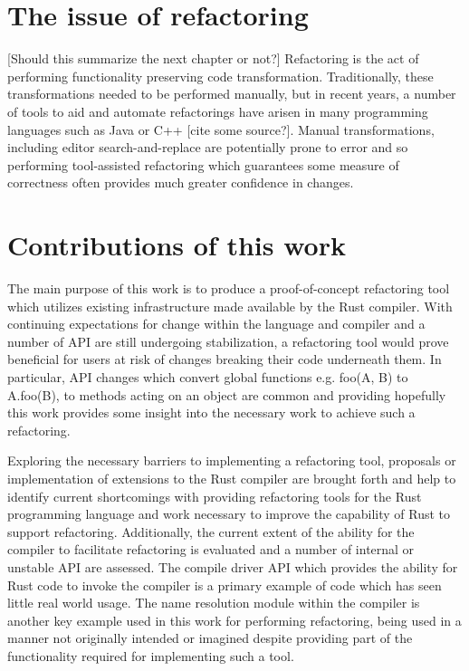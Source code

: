 \section{The issue of refactoring}\label{S:refactorintro}
[Should this summarize the next chapter or not?] Refactoring is the act of performing functionality preserving code transformation. Traditionally, these transformations needed to be performed manually, but in recent years, a number of tools to aid and automate refactorings have arisen in many programming languages such as Java or C++ [cite some source?]. Manual transformations, including editor search-and-replace are potentially prone to error and so performing tool-assisted refactoring which guarantees some measure of correctness often provides much greater confidence in changes.

\section{Contributions of this work}\label{S:contrib}
The main purpose of this work is to produce a proof-of-concept refactoring tool which utilizes existing infrastructure made available by the Rust compiler. With continuing expectations for change within the language and compiler and a number of API are still undergoing stabilization, a refactoring tool would prove beneficial for users at risk of changes breaking their code underneath them. In particular, API changes which convert global functions e.g. foo(A, B) to A.foo(B), to methods acting on an object are common and providing hopefully this work provides some insight into the necessary work to achieve such a refactoring. 

Exploring the necessary barriers to implementing a refactoring tool, proposals or implementation of extensions to the Rust compiler are brought forth and help to identify current shortcomings with providing refactoring tools for the Rust programming language and work necessary to improve the capability of Rust to support refactoring. Additionally, the current extent of the ability for the compiler to facilitate refactoring is evaluated and a number of internal or unstable API are assessed. The compile driver API which provides the ability for Rust code to invoke the compiler is a primary example of code which has seen little real world usage. The name resolution module within the compiler is another key example used in this work for performing refactoring, being used in a manner not originally intended or imagined despite providing part of the functionality required for implementing such a tool.

